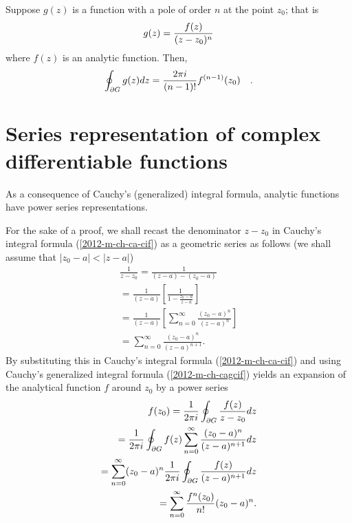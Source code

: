 Suppose $g(z)$ is a function with a pole of order $n$ at the point
 $z_0$; that is
 \begin{equation}
g(z)= {f(z)\over (z-z_0)^n}
\end{equation}
 where $f(z)$ is an analytic function. Then,
 \begin{equation}
\oint_{\partial G}g(z)dz={2\pi i\over (n-1)!}f^{(n-1)}(z_0)\quad .
\end{equation}

 \section{Series representation of complex differentiable functions}

As a consequence of Cauchy's (generalized) integral formula,
analytic functions have power series representations.

{\color{OliveGreen}
\bproof

For the sake of a proof,
we shall recast the denominator   $z-z_0$
in Cauchy's integral formula
(\ref{2012-m-ch-ca-cif})
as a geometric series as follows  (we shall assume that $|z_0 - a| < |z - a|$)
\begin{equation}
\begin{split}
\frac{1}{z - z_0}=
\frac{1}{(z - a) - (z_0 - a)}\\=
\frac{1}{ (z - a)} \left[\frac  {1}{1 - \frac{ z_0 - a }{ z - a }}\right]\\
=
\frac{1}{(z - a)} \left[ \sum_{n=0}^\infty \frac{ (z_0 - a)^n }{ (z - a)^n }\right]\\
=
 \sum_{n=0}^\infty \frac{ (z_0 - a)^n }{ (z - a)^{n+1} } .
\label{2012-m-ch-rgs}
\end{split}
\end{equation}
By substituting this in
Cauchy's integral formula
(\ref{2012-m-ch-ca-cif})
and using
Cauchy's generalized integral formula
(\ref{2012-m-ch-cagcif})
yields    an expansion of the analytical function $f$ around $z_0$ by a power series
\begin{equation}
\begin{split}
f(z_0)={1\over 2\pi i}\oint_{\partial G}{f(z)\over z-z_0}dz \\
={1\over 2\pi i}\oint_{\partial G} f(z) \sum_{n=0}^\infty \frac{ (z_0 - a)^n }{ (z - a)^{n+1}} dz \\
=  \sum_{n=0}^\infty (z_0 - a)^n  {1\over 2\pi i}\oint_{\partial G}  \frac{ f(z) }{ (z - a)^{n+1}} dz \\
=  \sum_{n=0}^\infty  \frac{ f^{n}(z_0) }{ n! }   (z_0 - a)^n  .
\end{split}
\label{2012-m-ch-ca-ssolut}
\end{equation}

\eproof
}


